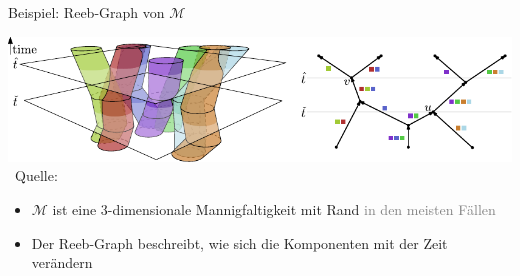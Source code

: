 \documentclass[
wide,
10pt,
xcolor={x11names,svgnames},
hyperref={pdfauthor={Jannes Bantje},colorlinks,urlcolor=maincolor,hidelinks=false,linkcolor=maincolor},
pantone312, 	%
euler-digits,
]{beamer}
\theoremstyle{definition}
\begin{document}
\begin{frame}[t]{Beispiel: Reeb-Graph von $\mathcal{M}$}
    \begin{center}
        \includegraphics[width=1.05\textwidth]{Bilder/manifold.pdf}
        \mbox{ }\hfill {\small Quelle: \cite[Fig.~2]{buchin2015}}\pause
        \begin{itemize}[<+->]
            \item $\mathcal{M}$ ist eine 3-dimensionale Mannigfaltigkeit mit Rand \textcolor{gray}{in den meisten Fällen}
            \item Der Reeb-Graph beschreibt, wie sich die Komponenten mit der Zeit verändern
        \end{itemize}
    \end{center}
\end{frame}
\end{document}
